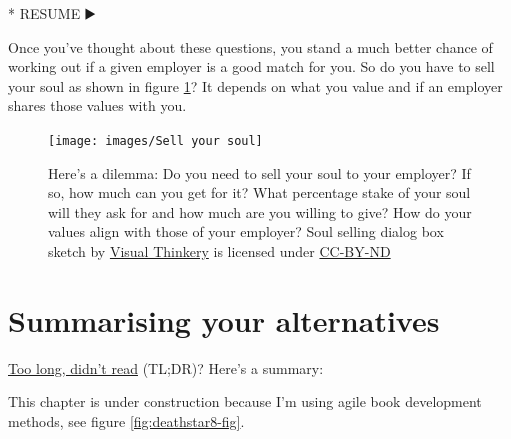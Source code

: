 \documentclass[
]{book}
\newenvironment{Shaded}{\begin{snugshade}}{\end{snugshade}}
\newcommand{\NormalTok}[1]{#1}
\newcommand{\SpecialStringTok}[1]{\textcolor[rgb]{0.31,0.60,0.02}{#1}}
\begin{document}
\begin{Shaded}
\begin{Highlighting}[]
\SpecialStringTok{* }\NormalTok{RESUME ▶️}
\end{Highlighting}
\end{Shaded}

Once you've thought about these questions, you stand a much better chance of working out if a given employer is a good match for you. So do you have to sell your soul as shown in figure \ref{fig:soul-fig}? It depends on what you value and if an employer shares those values with you.

\begin{figure}

{\centering \texttt{[image: images/Sell your soul]} 

}

\caption{Here's a dilemma: Do you need to sell your soul to your employer? If so, how much can you get for it? What percentage stake of your soul will they ask for and how much are you willing to give? How do your values align with those of your employer? Soul selling dialog box sketch by \href{https://visualthinkery.com/}{Visual Thinkery} is licensed under \href{https://creativecommons.org/licenses/by-nd/4.0/}{CC-BY-ND}}\label{fig:soul-fig}
\end{figure}



\hypertarget{tldr11}{%
\section{Summarising your alternatives}\label{tldr11}}

\href{https://en.wiktionary.org/wiki/too_long;_didn\%27t_read}{Too long, didn't read} (TL;DR)? Here's a summary:

This chapter is under construction because I'm using agile book development methods, see figure \ref{fig:deathstar8-fig}.
\end{document}
